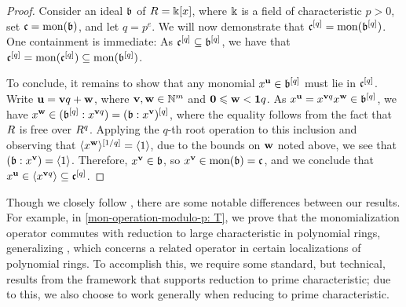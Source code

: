 \documentclass{amsart}
\begin{document}
\begin{proof}  Consider an ideal $\mathfrak{b}$ of $R=\Bbbk[x]$, where $\Bbbk$ is a field of characteristic $p>0$, set $\mathfrak{c} = \operatorname{mon}(\mathfrak{b})$, and let $q=p^e$.  We will now demonstrate that $\mathfrak{c}^{[q]} = \operatorname{mon}(\mathfrak{b}^{[q]})$.  One containment is immediate:   As $\mathfrak{c}^{[q]} \subseteq \mathfrak{b}^{[q]}$, we have that $\mathfrak{c}^{[q]} = \operatorname{mon}(\mathfrak{c}^{[q]}) \subseteq \operatorname{mon}(\mathfrak{b}^{[q]})$.
   
   To conclude, it remains to show that any monomial $x^{\mathbf{u}} \in \mathfrak{b}^{[q]}$ must lie in $\mathfrak{c}^{[q]}$.
   Write $\mathbf{u} = \mathbf{v}q + \mathbf{w}$, where $\mathbf{v}, \mathbf{w} \in \mathbb{N}^m$ and $\mathbf{0} \leqslant \mathbf{w} < \mathbf{1}q$.
   As $x^{\mathbf{u}} = x^{\mathbf{v}q} x^{\mathbf{w}} \in \mathfrak{b}^{[q]}$, we have $x^{\mathbf{w}} \in ( \mathfrak{b}^{[q]}: x^{\mathbf{v}q}) = (\mathfrak{b}:x^{\mathbf{v}})^{[q]}$, where the equality follows from the fact that $R$ is free over $R^q$.
   Applying the $q$-th root operation to this inclusion and observing that $\langle x^{\mathbf{w}} \rangle^{[1/q]} = \langle 1 \rangle$, due to the bounds on $\mathbf{w}$ noted above, we see that $ (\mathfrak{b}: x^{\mathbf{v}}) = \langle 1 \rangle$.
   Therefore, $x^{\mathbf{v}} \in \mathfrak{b}$, so $x^{\mathbf{v}} \in \operatorname{mon}(\mathfrak{b}) = \mathfrak{c}$, and we conclude that $x^{\mathbf{u}} \in \langle x^{\mathbf{v}q} \rangle \subseteq \mathfrak{c}^{[q]}$.
\end{proof}



Though we closely follow \cite{budur+mustata+saito.roots_bs_polys_monomial}, there are some notable differences between our results.   For example, in \cref{mon-operation-modulo-p: T}, we prove that the monomialization operator commutes with reduction to large characteristic in polynomial rings, generalizing \cite[Lemma 6.2]{budur+mustata+saito.roots_bs_polys_monomial}, which concerns a related operator in certain localizations of polynomial rings.  To accomplish this, we require some standard, but technical, results from the framework that supports reduction to prime characteristic; due to this, we also choose to work generally when reducing to prime characteristic.
\end{document}
